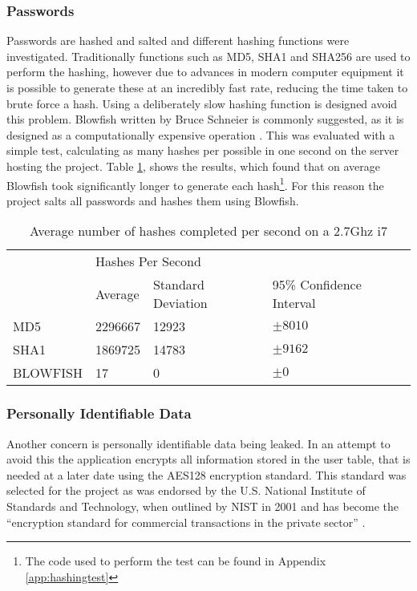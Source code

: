 \subsubsection{Passwords}
Passwords are hashed and salted and different hashing functions were investigated. Traditionally functions such as MD5, SHA1 and SHA256 are used to perform the hashing, however due to advances in modern computer equipment it is possible to generate these at an incredibly fast rate, reducing the time taken to brute force a hash.
%
Using a deliberately slow hashing function is designed avoid this problem. Blowfish written by Bruce Schneier is commonly suggested, as it is designed as a computationally expensive operation \parencite{schneier1994description} . This was evaluated with a simple test, calculating as many hashes per possible in one second on the server hosting the project. Table \ref{tab:hashingspeed}, shows the results, which found that on average Blowfish took significantly longer to generate each hash\footnote{The code used to perform the test can be found in Appendix \ref{app:hashingtest}}.
%
For this reason the project salts all passwords and hashes them using Blowfish.

\begin{table}[h]
\begin{tabular}{llll}
         & \multicolumn{3}{l}{Hashes Per Second}                   \\
         & Average & Standard Deviation & 95\% Confidence Interval \\
MD5      & \num{2296667} & \num{12923}  & $\pm 8010$   \\
SHA1     & \num{1869725} & \num{14783}  & $\pm 9162$    \\
BLOWFISH & 17            & 0            & $\pm 0$                 \\
\end{tabular}
\caption{Average number of hashes completed per second on a 2.7Ghz i7}
\label{tab:hashingspeed}
\end{table}

\subsubsection{Personally Identifiable Data}
Another concern is personally identifiable data being leaked. In an attempt to avoid this the application encrypts all information stored in the user table, that is needed at a later date using the AES128 encryption standard. This standard was selected for the project as was endorsed by the U.S. National Institute of Standards and Technology, when outlined by NIST in 2001 and has become the ``encryption standard for commercial transactions in the private sector'' \cite{nist2010aes, stair2009informationsystems}.

